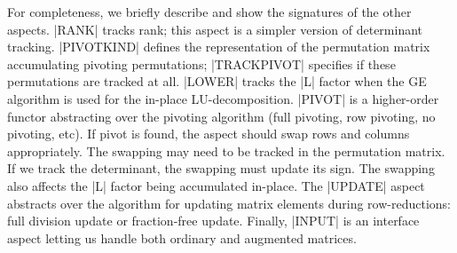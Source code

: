 \documentclass{elsart}
\begin{document}
For completeness, we briefly describe and show the signatures of the
other aspects. |RANK| tracks rank; this aspect is a simpler
version of determinant tracking. |PIVOTKIND| defines the
representation of the permutation matrix accumulating pivoting
permutations; |TRACKPIVOT| specifies if these permutations are
tracked at all. |LOWER| tracks the |L| factor when the GE algorithm is
used for the in-place LU-decomposition. |PIVOT| is a higher-order
functor abstracting over the pivoting algorithm (full pivoting, row
pivoting, no pivoting, etc). If pivot is found, the aspect should swap
rows and columns appropriately. The swapping may need to be tracked in
the permutation matrix. If we track the determinant,
the swapping must update its sign. The
swapping also affects the |L| factor being accumulated in-place. The
|UPDATE| aspect abstracts over the algorithm for updating matrix
elements during row-reductions: full division update or fraction-free
update. Finally, |INPUT| is an interface aspect letting us handle both
ordinary and augmented matrices.
\end{document}
